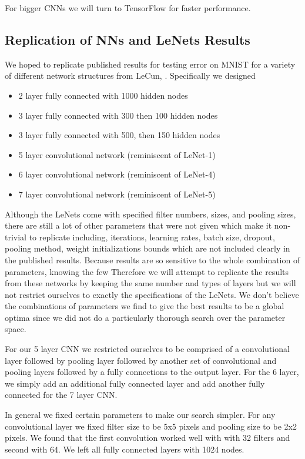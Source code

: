 \documentclass[12pt, twocolumn]{article}
\begin{document}
For bigger CNNs we will turn to TensorFlow for faster performance. 
\subsection{Replication of NNs and LeNets Results}

We hoped to replicate published results for testing error on MNIST for a variety of different network structures from LeCun, \cite{LeCun1998}. Specifically we designed

\begin{itemize}
\item{2 layer fully connected with 1000 hidden nodes}
\item{3 layer fully connected with 300 then 100 hidden nodes}
\item{3 layer fully connected with 500, then 150 hidden nodes}
\item{5 layer convolutional network (reminiscent of LeNet-1)}
\item{6 layer convolutional network (reminiscent of LeNet-4)}
\item{7 layer convolutional network (reminiscent of LeNet-5)}
\end{itemize}


Although the LeNets come with specified filter numbers, sizes, and pooling sizes, there are still a lot of other parameters that were not given which make it non-trivial to replicate including, iterations, learning rates, batch size, dropout, pooling method, weight initializations bounds which are not included clearly in the published results. Because results are so sensitive to the whole combination of parameters, knowing the few  Therefore we will attempt to replicate the results from these networks by keeping the same number and types of layers but we will not restrict ourselves to exactly the specifications of the LeNets. We don't  believe the combinations of parameters we find to give the best results to be a global optima since we did not do a particularly thorough search over the parameter space. 

For our 5 layer CNN we restricted ourselves to be comprised of a convolutional layer followed by pooling layer followed by another set of convolutional and pooling layers followed by a fully connections to the output layer. For the 6 layer, we simply add an additional fully connected layer and add another fully connected for the 7 layer CNN. 


In general we fixed certain parameters to make our search simpler. For any convolutional layer we fixed filter size to be 5x5 pixels and pooling size to be 2x2 pixels. We found that the first convolution worked well with with 32 filters and second with 64.   We left all fully connected layers with 1024 nodes. 
\end{document}
